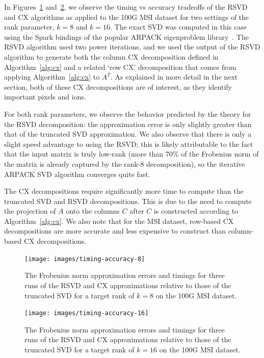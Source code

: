   In Figures~\ref{fig:timing-accuracy-8} and~\ref{fig:timing-accuracy-16}, we observe the timing vs accuracy tradeoffs of the RSVD and CX algorithms
  as applied to the 100G MSI dataset for two settings of the rank parameter, $k=8$ and $k=16.$ The exact SVD was computed in this case using the
  Spark bindings of the popular ARPACK eigenproblem library~\cite{ArpackUserGuide}. The RSVD algorithm used two power iterations, and we used the output of the RSVD algorithm to generate
  both the column CX decomposition defined in Algorithm~\ref{alg:cx} and a related `row CX' decomposition that comes from applying Algorithm~\ref{alg:cx}
  to $A^T.$ As explained in more detail in the next section, both of these CX decompositions are of interest, as they identify important pixels and ions.

  For both rank parameters, we observe the behavior predicted by the theory for the RSVD decomposition: the approximation error is only slightly greater than that of the 
  truncated SVD approximation. We also observe that there is only a slight speed advantage to using the RSVD; this is likely attributable to the fact that the input matrix
  is truly low-rank (more than 70\% of the Frobenius norm of the matrix is already captured by the rank-8 decomposition), so the iterative ARPACK SVD algorithm converges 
  quite fast.

  The CX decompositions require significantly more time to compute than the truncated SVD and RSVD decompositions. This is due to the need to compute the projection of $A$ onto
  the columns $C$ after $C$ is constructed according to Algorithm~\ref{alg:cx}. We also note that for the MSI dataset, row-based CX decompositions are more 
  accurate and less expensive to construct than column-based CX decompositions. 

  \begin{figure}[h!btp]
    \begin{centering}
      \texttt{[image: images/timing-accuracy-8]}
      \end{centering}
      \caption{The Frobenius norm approximation errors and timings for three runs of the RSVD and CX approximations relative to those of the truncated SVD for a target rank of $k=8$ on the 100G MSI dataset.}
    \label{fig:timing-accuracy-8}
  \end{figure}

  \begin{figure}[h!btp]
    \begin{centering}
      \texttt{[image: images/timing-accuracy-16]}
      \end{centering}
      \caption{The Frobenius norm approximation errors and timings for three runs of the RSVD and CX approximations relative to those of the truncated SVD for a target rank of $k=16$ on the 100G MSI dataset.}
    \label{fig:timing-accuracy-16}
  \end{figure}

